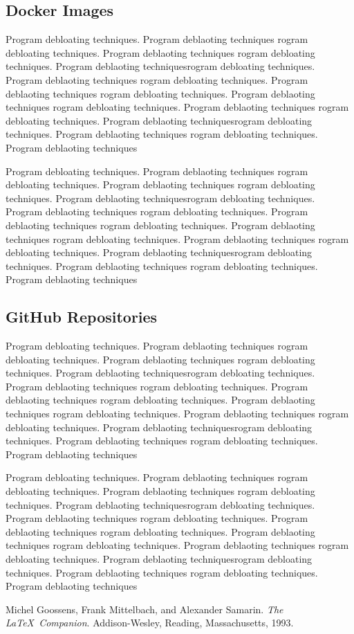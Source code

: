 \documentclass{relatorio}
\begin{document}
\subsection{Docker Images}%
\label{Tools}

Program debloating techniques. Program deblaoting techniques rogram debloating techniques. Program deblaoting techniques
rogram debloating techniques. Program deblaoting techniquesrogram debloating techniques. Program deblaoting techniques
rogram debloating techniques. Program deblaoting techniques rogram debloating techniques. Program deblaoting techniques
rogram debloating techniques. Program deblaoting techniques 
rogram debloating techniques. Program deblaoting techniquesrogram debloating techniques. Program deblaoting techniques
rogram debloating techniques. Program deblaoting techniques

Program debloating techniques. Program deblaoting techniques rogram debloating techniques. Program deblaoting techniques
rogram debloating techniques. Program deblaoting techniquesrogram debloating techniques. Program deblaoting techniques
rogram debloating techniques. Program deblaoting techniques rogram debloating techniques. Program deblaoting techniques
rogram debloating techniques. Program deblaoting techniques 
rogram debloating techniques. Program deblaoting techniquesrogram debloating techniques. Program deblaoting techniques
rogram debloating techniques. Program deblaoting techniques

\subsection{GitHub Repositories}%
\label{Tools}

Program debloating techniques. Program deblaoting techniques rogram debloating techniques. Program deblaoting techniques
rogram debloating techniques. Program deblaoting techniquesrogram debloating techniques. Program deblaoting techniques
rogram debloating techniques. Program deblaoting techniques rogram debloating techniques. Program deblaoting techniques
rogram debloating techniques. Program deblaoting techniques 
rogram debloating techniques. Program deblaoting techniquesrogram debloating techniques. Program deblaoting techniques
rogram debloating techniques. Program deblaoting techniques

Program debloating techniques. Program deblaoting techniques rogram debloating techniques. Program deblaoting techniques
rogram debloating techniques. Program deblaoting techniquesrogram debloating techniques. Program deblaoting techniques
rogram debloating techniques. Program deblaoting techniques rogram debloating techniques. Program deblaoting techniques
rogram debloating techniques. Program deblaoting techniques 
rogram debloating techniques. Program deblaoting techniquesrogram debloating techniques. Program deblaoting techniques
rogram debloating techniques. Program deblaoting techniques

\nocite{*}
\begin{thebibliography}{9}
	Michel Goossens, Frank Mittelbach, and Alexander Samarin. 
	\textit{The \LaTeX\ Companion}. 
	Addison-Wesley, Reading, Massachusetts, 1993.
	
\end{thebibliography}
\end{document}
